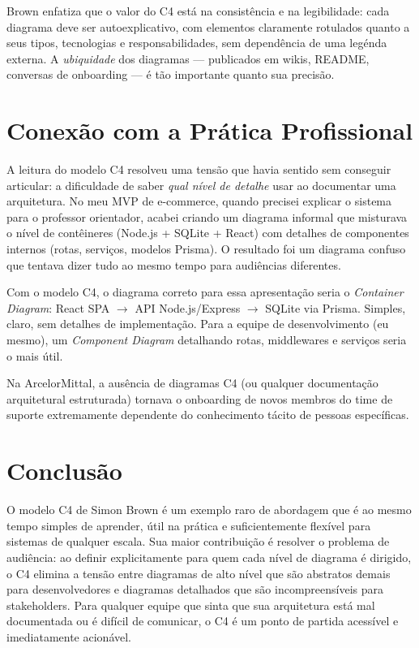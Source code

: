 \documentclass[12pt,a4paper]{article}
\begin{document}
Brown enfatiza que o valor do C4 est\'a na consist\^encia e na legibilidade:
cada diagrama deve ser autoexplicativo, com elementos claramente rotulados quanto
a seus tipos, tecnologias e responsabilidades, sem depend\^encia de uma leg\'enda
externa. A \textit{ubiquidade} dos diagramas --- publicados em wikis, README,
conversas de onboarding --- \'e t\~ao importante quanto sua precis\~ao.

\section{Conex\~ao com a Pr\'atica Profissional}

A leitura do modelo C4 resolveu uma tens\~ao que havia sentido sem conseguir
articular: a dificuldade de saber \textit{qual n\'ivel de detalhe} usar ao
documentar uma arquitetura. No meu MVP de e-commerce, quando precisei explicar
o sistema para o professor orientador, acabei criando um diagrama informal que
misturava o n\'ivel de cont\^eineres (Node.js + SQLite + React) com detalhes de
componentes internos (rotas, servi\c{c}os, modelos Prisma). O resultado foi um
diagrama confuso que tentava dizer tudo ao mesmo tempo para audi\^encias diferentes.

Com o modelo C4, o diagrama correto para essa apresenta\c{c}\~ao seria o
\textit{Container Diagram}: React SPA $\to$ API Node.js/Express $\to$ SQLite via
Prisma. Simples, claro, sem detalhes de implementa\c{c}\~ao. Para a equipe de
desenvolvimento (eu mesmo), um \textit{Component Diagram} detalhando rotas,
middlewares e servi\c{c}os seria o mais \'util.

Na ArcelorMittal, a aus\^encia de diagramas C4 (ou qualquer documenta\c{c}\~ao
arquitetural estruturada) tornava o onboarding de novos membros do time de suporte
extremamente dependente do conhecimento t\'acito de pessoas espec\'ificas.

\section{Conclus\~ao}

O modelo C4 de Simon Brown \'e um exemplo raro de abordagem que \'e ao mesmo tempo
simples de aprender, \'util na pr\'atica e suficientemente flex\'ivel para
sistemas de qualquer escala. Sua maior contribui\c{c}\~ao \'e resolver o problema
de audi\^encia: ao definir explicitamente para quem cada n\'ivel de diagrama \'e
dirigido, o C4 elimina a tens\~ao entre diagramas de alto n\'ivel que s\~ao
abstratos demais para desenvolvedores e diagramas detalhados que s\~ao
incompreens\'iveis para stakeholders. Para qualquer equipe que sinta que sua
arquitetura est\'a mal documentada ou \'e dif\'icil de comunicar, o C4 \'e um
ponto de partida acess\'ivel e imediatamente acion\'avel.
\end{document}
